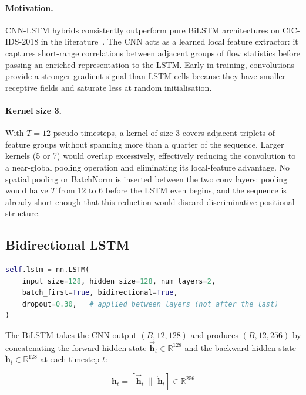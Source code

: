 \documentclass[12pt]{article}
\theoremstyle{plain}
\begin{document}
\paragraph{Motivation.} CNN-LSTM hybrids consistently outperform pure BiLSTM architectures on CIC-IDS-2018 in the literature~\cite{Ramyaelineni2020, Wang2023}. The CNN acts as a learned local feature extractor: it captures short-range correlations between adjacent groups of flow statistics before passing an enriched representation to the LSTM. Early in training, convolutions provide a stronger gradient signal than LSTM cells because they have smaller receptive fields and saturate less at random initialisation.

\paragraph{Kernel size 3.} With $T = 12$ pseudo-timesteps, a kernel of size 3 covers adjacent triplets of feature groups without spanning more than a quarter of the sequence. Larger kernels (5 or 7) would overlap excessively, effectively reducing the convolution to a near-global pooling operation and eliminating its local-feature advantage. No spatial pooling or BatchNorm is inserted between the two conv layers: pooling would halve $T$ from 12 to 6 before the LSTM even begins, and the sequence is already short enough that this reduction would discard discriminative positional structure.

\subsection{Bidirectional LSTM}

\begin{lstlisting}[language=Python, caption={BiLSTM configuration.}]
self.lstm = nn.LSTM(
    input_size=128, hidden_size=128, num_layers=2,
    batch_first=True, bidirectional=True,
    dropout=0.30,   # applied between layers (not after the last)
)
\end{lstlisting}

The BiLSTM takes the CNN output $(B, 12, 128)$ and produces $(B, 12, 256)$ by concatenating the forward hidden state $\overrightarrow{\mathbf{h}}_t \in \mathbb{R}^{128}$ and the backward hidden state $\overleftarrow{\mathbf{h}}_t \in \mathbb{R}^{128}$ at each timestep $t$:

\begin{equation}
\mathbf{h}_t = \left[\overrightarrow{\mathbf{h}}_t \;\big\|\; \overleftarrow{\mathbf{h}}_t\right] \in \mathbb{R}^{256}
\end{equation}
\end{document}
